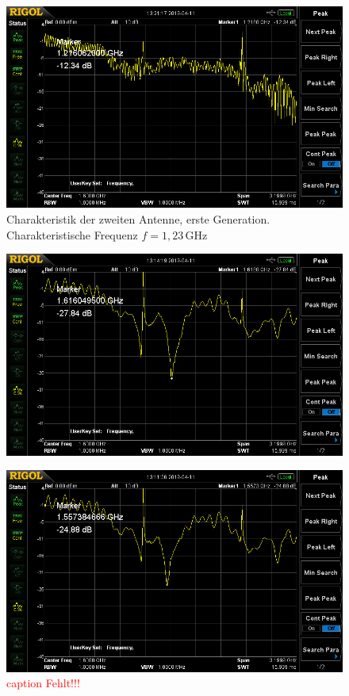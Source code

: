 \documentclass[titlepage,11pt,a4paper,ngerman]{article}
\begin{document}
\begin{figure}[ht]
	\includegraphics[scale=0.075]{Bilder/ant42.jpg}
	\centering
	\caption{Charakteristik der zweiten Antenne, erste Generation. Charakteristische Frequenz $f=1{,}23\,$GHz}
	\label{Ant2alt}
\end{figure}

\begin{figure}[ht]
	\includegraphics[scale=0.075]{Bilder/ant12.jpg}
	\centering
	\caption{}
	\label{Ant1}
\end{figure}

\begin{figure}[ht]
	\includegraphics[scale=0.075]{Bilder/ant22.jpg}
	\centering
	\caption{\textcolor{red}{caption Fehlt!!!}}
	\label{Ant2}
\end{figure}
\end{document}
